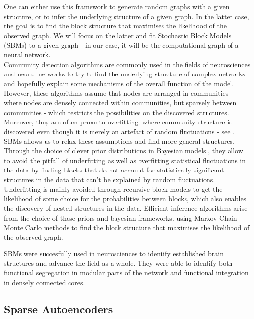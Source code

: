 \documentclass{article}
\begin{document}
One can either use this framework to generate random graphs with a given structure, or to infer the underlying structure of a given graph. In the latter case, the goal is to find the block structure that maximises the likelihood of the observed graph. We will focus on the latter and fit Stochastic Block Models (SBMs) \citep{Peixoto_2019, lee2019review} to a given graph - in our case, it will be the computational graph of a neural network.\\

Community detection algorithms are commonly used in the fields of neurosciences \citep{chen2013inferring} and neural networks \citep{filan2021clusterability, bushnaq2024using} to try to find the underlying structure of complex networks and hopefully explain some mechanisms of the overall function of the model. However, these algorithms assume that nodes are arranged in communities - where nodes are densely connected within communities, but sparsely between communities - which restricts the possibilities on the discovered structures. Moreover, they are often prone to overfitting, where community structure is discovered even though it is merely an artefact of random fluctuations - see \citet{Peixoto_2019}.\\

SBMs allows us to relax these assumptions and find more general structures. Through the choice of clever prior distributions in Bayesian models \citep{Peixoto_2019}, they allow to avoid the pitfall of underfitting as well as overfitting statistical fluctuations in the data by finding blocks that do not account for statistically significant structures in the data that can't be explained by random fluctuations. Underfitting is mainly avoided through recursive block models to get the likelihood of some choice for the probabilities between blocks, which also enables the discovery of nested structures in the data. Efficient inference algorithms arise from the choice of these priors and bayesian frameworks, using Markov Chain Monte Carlo methods to find the block structure that maximises the likelihood of the observed graph.

SBMs were succesfully used in neurosciences \citep{pavlovic2015generalised, peixoto2018nonparametric} to identify established brain structures and advance the field as a whole. They were able to identify both functional segregation in modular parts of the network and functional integration in densely connected cores.

\subsection{Sparse Autoencoders}
\label{sec:SAE}
\end{document}
